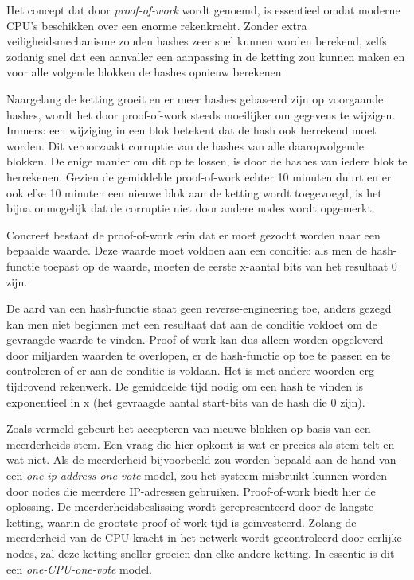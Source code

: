 	Het concept dat door \textcite{Nakamoto2008} \textit{proof-of-work} wordt genoemd, is essentieel omdat moderne CPU’s beschikken over een enorme rekenkracht. Zonder extra veiligheidsmechanisme zouden hashes zeer snel kunnen worden berekend, zelfs zodanig snel dat een aanvaller een aanpassing in de ketting zou kunnen maken en voor alle volgende blokken de hashes opnieuw berekenen. 
	
	Naargelang de ketting groeit en er meer hashes gebaseerd zijn op voorgaande hashes, wordt het door proof-of-work steeds moeilijker om gegevens te wijzigen. Immers: een wijziging in een blok betekent dat de hash ook herrekend moet worden. Dit veroorzaakt corruptie van de hashes van alle daaropvolgende blokken. De enige manier om dit op te lossen, is door de hashes van iedere blok te herrekenen. Gezien de gemiddelde proof-of-work echter 10 minuten duurt en er ook elke 10 minuten een nieuwe blok aan de ketting wordt toegevoegd, is het bijna onmogelijk dat de corruptie niet door andere nodes wordt opgemerkt.
	
	Concreet bestaat de proof-of-work erin dat er moet gezocht worden naar een bepaalde waarde. Deze waarde moet voldoen aan een conditie: als men de hash-functie toepast op de waarde, moeten de eerste x-aantal bits van het resultaat 0 zijn. 
	
	De aard van een hash-functie staat geen reverse-engineering toe, anders gezegd kan men niet beginnen met een resultaat dat aan de conditie voldoet om de gevraagde waarde te vinden. Proof-of-work kan dus alleen worden opgeleverd door miljarden waarden te overlopen, er de hash-functie op toe te passen en te controleren of er aan de conditie is voldaan. Het is met andere woorden erg tijdrovend rekenwerk. De gemiddelde tijd nodig om een hash te vinden is exponentieel in x (het gevraagde aantal start-bits van de hash die 0 zijn).
	
	Zoals vermeld gebeurt het accepteren van nieuwe blokken op basis van een meerderheids-stem. Een vraag die hier opkomt is wat er precies als stem telt en wat niet. Als de meerderheid bijvoorbeeld zou worden bepaald aan de hand van een \textit{one-ip-address-one-vote} model, zou het systeem misbruikt kunnen worden door nodes die meerdere IP-adressen gebruiken. Proof-of-work biedt hier de oplossing. De meerderheidsbeslissing wordt gerepresenteerd door de langste ketting, waarin de grootste proof-of-work-tijd is geïnvesteerd. Zolang de meerderheid van de CPU-kracht in het netwerk wordt gecontroleerd door eerlijke nodes, zal deze ketting sneller groeien dan elke andere ketting. In essentie is dit een \textit{one-CPU-one-vote} model. ~\autocite{Nakamoto2008}
	
